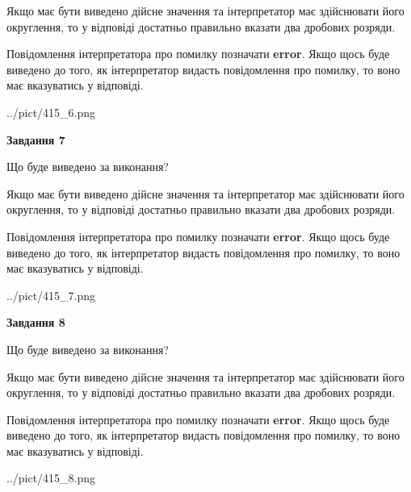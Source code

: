\documentclass[12pt, ukrainian]{article}
\begin{document}
{\begin {Large}
Якщо має бути виведено дійсне значення та інтерпретатор має здійснювати його округлення, 
то у відповіді достатньо правильно вказати два дробових розряди.

Повідомлення інтерпретатора про помилку позначати \textbf{error}.
Якщо щось буде виведено до того, як інтерпретатор видасть повідомлення про помилку, 
то воно має вказуватись у відповіді. \par

\begin{center}
	{../pict/415_6.png}
\end{center}
\newpage

{\begin {center}\textbf{Завдання 7}\end {center}}\par
Що буде виведено за виконання? \par

Якщо має бути виведено дійсне значення та інтерпретатор має здійснювати його округлення, 
то у відповіді достатньо правильно вказати два дробових розряди.

Повідомлення інтерпретатора про помилку позначати \textbf{error}.
Якщо щось буде виведено до того, як інтерпретатор видасть повідомлення про помилку, 
то воно має вказуватись у відповіді. \par

\begin{center}
	{../pict/415_7.png}
\end{center}
\newpage

{\begin {center}\textbf{Завдання 8}\end {center}}\par
Що буде виведено за виконання? \par

Якщо має бути виведено дійсне значення та інтерпретатор має здійснювати його округлення, 
то у відповіді достатньо правильно вказати два дробових розряди.

Повідомлення інтерпретатора про помилку позначати \textbf{error}.
Якщо щось буде виведено до того, як інтерпретатор видасть повідомлення про помилку, 
то воно має вказуватись у відповіді. \par

\begin{center}
	{../pict/415_8.png}
\end{center}
\newpage


\end{Large}}
\end{document}
